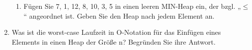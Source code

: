 \documentclass{lehramt-informatik-aufgabe}
\begin{document}
\begin{enumerate}
\begin{enumerate}

\item Fügen Sie 7, 1, 12, 8, 10, 3, 5 in einen leeren MIN-Heap ein,
der bzgl. „$\leq$“ angeordnet ist.
Geben Sie den Heap nach jedem Element an.
\end{enumerate}


\item Was ist die worst-case Laufzeit in O-Notation
für das Einfügen eines Elements in einen Heap der Größe n?
Begründen Sie ihre Antwort.
\end{enumerate}
\end{document}
